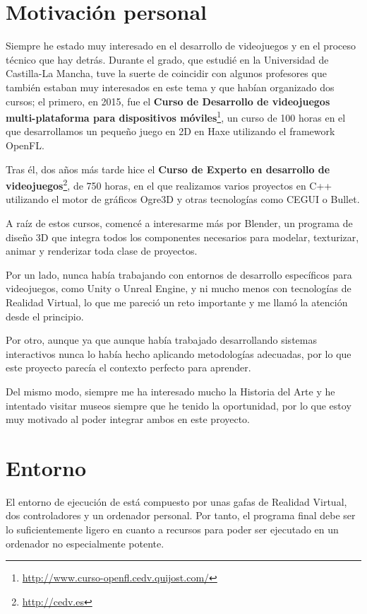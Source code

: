 \section{Motivación personal}

Siempre he estado muy interesado en el desarrollo de videojuegos y en el proceso técnico que hay detrás. Durante el grado, que estudié en la Universidad de Castilla-La Mancha, tuve la suerte de coincidir con algunos profesores que también estaban muy interesados en este tema y que habían organizado dos cursos; el primero, en 2015, fue el \textbf{Curso de Desarrollo de videojuegos multi-plataforma para dispositivos móviles}\footnote{\url{http://www.curso-openfl.cedv.quijost.com/}}, un curso de 100 horas en el que desarrollamos un pequeño juego en 2D en Haxe utilizando el framework OpenFL.

Tras él, dos años más tarde hice el \textbf{Curso de Experto en desarrollo de videojuegos}\footnote{\url{http://cedv.es}}, de 750 horas, en el que realizamos varios proyectos en C++ utilizando el motor de gráficos Ogre3D y otras tecnologías como CEGUI o Bullet.

A raíz de estos cursos, comencé a interesarme más por Blender, un programa de diseño 3D que integra todos los componentes necesarios para modelar, texturizar, animar y renderizar toda clase de proyectos.

Por un lado, nunca había trabajando con entornos de desarrollo específicos para videojuegos, como Unity o Unreal Engine, y ni mucho menos con tecnologías de Realidad Virtual, lo que me pareció un reto importante y me llamó la atención desde el principio. 

Por otro, aunque ya que aunque había trabajado desarrollando sistemas interactivos nunca lo había hecho aplicando metodologías adecuadas, por lo que este proyecto parecía el contexto perfecto para aprender.

Del mismo modo, siempre me ha interesado mucho la Historia del Arte y he intentado visitar museos siempre que he tenido la oportunidad, por lo que estoy muy motivado al poder integrar ambos en este proyecto.

\section{Entorno}

El entorno de ejecución de \MineRVa está compuesto por unas gafas de Realidad Virtual, dos controladores y un ordenador personal. Por tanto, el programa final debe ser lo suficientemente ligero en cuanto a recursos para poder ser ejecutado en un ordenador no especialmente potente.

